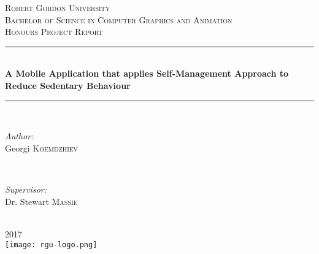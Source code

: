 \begin{titlepage}
  \newcommand{\HRule}{\rule{\linewidth}{0.5mm}}
  \center

  \textsc{\LARGE Robert Gordon University}\\[1.5cm]
  \textsc{\Large Bachelor of Science in Computer Graphics and Animation}\\[0.5cm]
  \textsc{\large Honours Project Report}\\[0.5cm]

  \HRule \\[0.4cm]
  { \huge \bfseries A Mobile Application that applies Self-Management Approach to Reduce Sedentary Behaviour}\\[0.4cm]
  \HRule \\[1.5cm]

  \begin{minipage}{0.4\textwidth}
  \begin{flushleft} \large
  \emph{Author:}\\
  Georgi \textsc{Koemdzhiev}
  \end{flushleft}
  \end{minipage}
  ~
  \begin{minipage}{0.4\textwidth}
  \begin{flushright} \large
  \emph{Supervisor:} \\
  Dr. Stewart \textsc{Massie}
  \end{flushright}
  \end{minipage}\\[4cm]

  {\large 2017}\\[3cm]

  \texttt{[image: rgu-logo.png]}\\[1cm]
  \vfill
\end{titlepage}